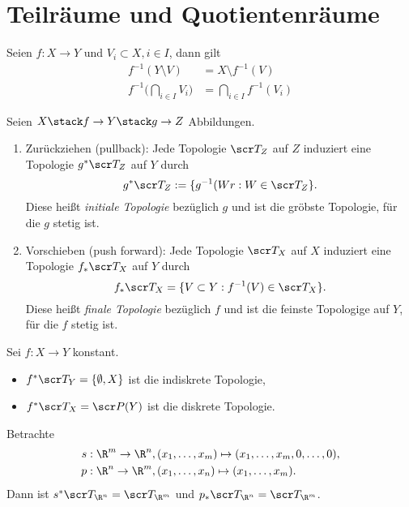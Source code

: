 \section{Teilräume und Quotientenräume}


Seien $f: X \to Y$ und $V_i \subset X, i \in I$, dann gilt
\begin{align*}
	f^{-1}(Y \setminus V) &= X \setminus f^{-1}(V) \\
	f^{-1}\Big(\bigcap_{i\in I} V_i\Big) &= \bigcap_{i\in I} f^{-1}(V_i)
\end{align*}
\begin{df}
	Seien $X \stack f\to Y \stack g\to Z$ Abbildungen.
	\begin{enumerate}[(1)]
		\item
			Zurückziehen (pullback):
			Jede Topologie $\scr T_Z$ auf $Z$ induziert eine Topologie $g^*\scr T_Z$ auf $Y$ durch
			\[
				g^* \scr T_Z
				:= \{ g^{-1}(Wr : W \in \scr T_Z \}.
			\]
			Diese heißt \emph{initiale Topologie} bezüglich $g$ und ist die gröbste Topologie, für die $g$ stetig ist.
		\item
			Vorschieben (push forward):
			Jede Topologie $\scr T_X$ auf $X$ induziert eine Topologie $f_* \scr T_X$ auf $Y$ durch
			\[
				f_* \scr T_X = \{ V \subset Y : f^{-1}(V) \in \scr T_X \}.
			\]
			Diese heißt \emph{finale Topologie} bezüglich $f$ und ist die feinste Topologige auf $Y$, für die $f$ stetig ist.
	\end{enumerate}
\end{df}

\begin{ex}
	Sei $f: X \to Y$ konstant.
	\begin{itemize}
		\item
			$f^* \scr T_Y = \{ \emptyset, X \}$ ist die indiskrete Topologie,
		\item
			$f^* \scr T_X = \scr P(Y)$ ist die diskrete Topologie.
	\end{itemize}
\end{ex}

\begin{ex}
	Betrachte
	\begin{align*}
		s&: \R^m \to \R^n, (x_1,\dotsc, x_m) \mapsto (x_1, \dotsc, x_m, 0, \dotsc, 0), \\
		p&: \R^n \to \R^m, (x_1,\dotsc, x_n) \mapsto (x_1, \dotsc, x_m).
	\end{align*}
	Dann ist $s^* \scr T_{\R^n} = \scr T_{\R^m}$ und $p_* \scr T_{\R^n} = \scr T_{\R^m}$.
\end{ex}

